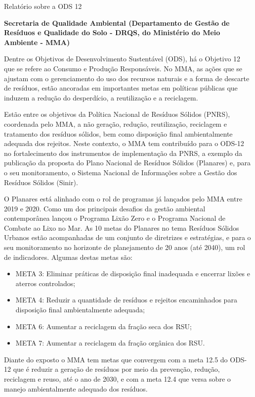 \documentclass{beamer}
\begin{document}
	\begin{frame}[allowframebreaks]{Relatório sobre a ODS 12}
		\par\textbf{Secretaria de Qualidade Ambiental (Departamento de Gestão de Resíduos e Qualidade do Solo - DRQS, do Ministério do Meio Ambiente - MMA)}
		
		Dentre os Objetivos de Desenvolvimento Sustentável (ODS), há o Objetivo 12 que se refere ao Consumo e Produção Responsáveis. No MMA, as ações que se ajustam com o gerenciamento do uso dos recursos naturais e a forma de descarte de resíduos, estão ancoradas em importantes metas em políticas públicas que induzem a redução do desperdício, a reutilização e a reciclagem.
		
		Estão entre os objetivos da Política Nacional de Resíduos Sólidos (PNRS), coordenada pelo MMA, a não geração, redução, reutilização, reciclagem e tratamento dos resíduos sólidos, bem como disposição final ambientalmente adequada dos rejeitos. Neste contexto, o MMA tem contribuído para o ODS-12 no fortalecimento dos instrumentos de implementação da PNRS, a exemplo da publicação da proposta do Plano Nacional de Resíduos Sólidos (Planares) e, para o seu monitoramento, o Sistema Nacional de Informações sobre a Gestão dos Resíduos Sólidos (Sinir).
		
		O Planares está alinhado com o rol de programas já lançados pelo MMA entre 2019 e 2020. Como um dos principais desafios da gestão ambiental contemporânea lançou o Programa Lixão Zero e o Programa Nacional de Combate ao Lixo no Mar. As 10 metas do Planares no tema Resíduos Sólidos Urbanos estão acompanhadas de um conjunto de diretrizes e estratégias, e para o seu monitoramento no horizonte de planejamento de 20 anos (até 2040), um rol de indicadores. Algumas destas metas são:
		
		\begin{itemize}
			\item META 3: Eliminar práticas de disposição final inadequada e encerrar lixões e aterros controlados;
			\item META 4: Reduzir a quantidade de resíduos e rejeitos encaminhados para disposição final ambientalmente adequada;
			\item META 6: Aumentar a reciclagem da fração seca dos RSU;
			\item META 7: Aumentar a reciclagem da fração orgânica dos RSU.
		\end{itemize}
		
		Diante do exposto o MMA tem metas que convergem com a meta 12.5 do ODS-12 que é reduzir a geração de resíduos por meio da prevenção, redução, reciclagem e reuso, até o ano de 2030, e com a meta 12.4 que versa sobre o manejo ambientalmente adequado dos resíduos.
		

\end{frame}
\end{document}
